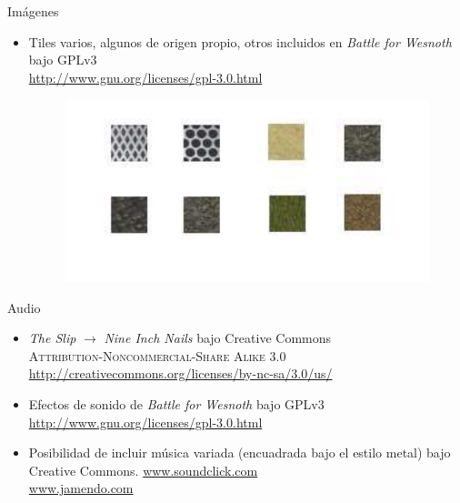 \documentclass[9pt,xcolor=svgnames]{beamer}
\begin{document}
  
  
  \begin{frame}{Imágenes}
   
   \begin{itemize}	  
    \item Tiles varios, algunos de origen propio, otros incluidos en
	  \textit{Battle for Wesnoth} bajo GPLv3\\
	  \url{http://www.gnu.org/licenses/gpl-3.0.html}
	  
	  \begin{figure}[t]
	   \includegraphics[scale=0.5]{./Imagenes/tiles.pdf}
	  \end{figure}
	  
   \end{itemize}
   
  \end{frame}
  
  
  \begin{frame}{Audio}
   \begin{itemize}
    \item \textit{The Slip} $\longrightarrow$ \textit{Nine Inch Nails}
	  bajo Creative Commons\\
	  \textsc{Attribution-Noncommercial-Share Alike 3.0}\\
	  \url{http://creativecommons.org/licenses/by-nc-sa/3.0/us/}\\
	  \vspace*{0.3cm}	  

    \item Efectos de sonido de \textit{Battle for Wesnoth} bajo GPLv3\\
	  \url{http://www.gnu.org/licenses/gpl-3.0.html}\\
	  \vspace*{0.3cm}
	  
    \item Posibilidad de incluir música variada (encuadrada bajo el
	  estilo metal) bajo Creative Commons.
	  \url{www.soundclick.com}\\
	  \url{www.jamendo.com}
   \end{itemize}
  \end{frame}
  
\end{document}
